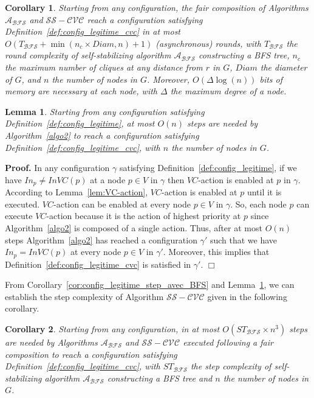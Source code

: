 \documentclass[11pt,letterpaper,onecolumn]{article}
\newtheorem{corollary}{Corollary}
\newtheorem{lemma}{Lemma}
\newenvironment{proof}{\noindent \begin{rm}{\textbf{Proof.} }}{\hspace*{\fill}$\Box$\par\end{rm} \vspace{.3cm}}
\begin{document}
\begin{corollary}
Starting from any configuration, the fair composition of Algorithms $\mathcal{A_{BFS}}$ and $\mathcal{SS-CVC}$ reach a configuration satisfying Definition~\ref{def:config_legitime_cvc} in at most $O(T_{\mathcal{BFS}}+\min(n_c \times Diam, n)+1)$ (asynchronous) rounds, with $T_{\mathcal{BFS}}$ the round complexity of self-stabilizing algorithm $\mathcal{A_{BFS}}$ constructing a BFS tree, $n_c$ the maximum number of cliques at any distance from $r$ in $G$, $Diam$ the diameter of $G$, and $n$ the number of nodes in $G$. Moreover, $O(\Delta \log(n))$ bits of memory are necessary at each node, with $\Delta$ the maximum degree of a node.
\end{corollary}

\begin{lemma}
\label{lem:config_legitime_cvc_step}
Starting from any configuration satisfying Definition~\ref{def:config_legitime}, at most $O(n)$ steps are needed by Algorithm~\ref{algo2} to reach a configuration satisfying Definition~\ref{def:config_legitime_cvc}, with $n$ the number of nodes in $G$.
\end{lemma}

\begin{proof}
In any configuration $\gamma$ satisfying Definition~\ref{def:config_legitime}, if we have $In_p \neq InVC(p)$ at a node $p \in V$ in $\gamma$ then $VC$-action is enabled at $p$ in $\gamma$. According to Lemma~\ref{lem:VC-action}, $VC$-action is enabled at $p$ until it is executed. $VC$-action can be enabled at every node $p \in V$ in $\gamma$. So, each node $p$ can execute $VC$-action because it is the action of highest priority at $p$ since Algorithm~\ref{algo2} is composed of a single action. Thus, after at most $O(n)$ steps Algorithm~\ref{algo2} has reached a configuration $\gamma'$ such that we have $In_p=InVC(p)$ at every node $p \in V$ in $\gamma'$. Moreover, this implies that Definition~\ref{def:config_legitime_cvc} is satisfied in $\gamma'$.
\end{proof}

From Corollary~\ref{cor:config_legitime_step_avec_BFS} and Lemma~\ref{lem:config_legitime_cvc_step}, we can establish the step complexity of Algorithm $\mathcal{SS-CVC}$ given in the following corollary.

\begin{corollary}
Starting from any configuration, in at most $O(ST_{\mathcal{BFS}} \times n^3)$ steps are needed by Algorithms $\mathcal{A_{BFS}}$ and $\mathcal{SS-CVC}$ executed following a fair composition to reach a configuration satisfying Definition~\ref{def:config_legitime_cvc}, with $ST_{\mathcal{BFS}}$ the step complexity of self-stabilizing algorithm $\mathcal{A_{BFS}}$ constructing a BFS tree and $n$ the number of nodes in $G$.
\end{corollary}
\end{document}
